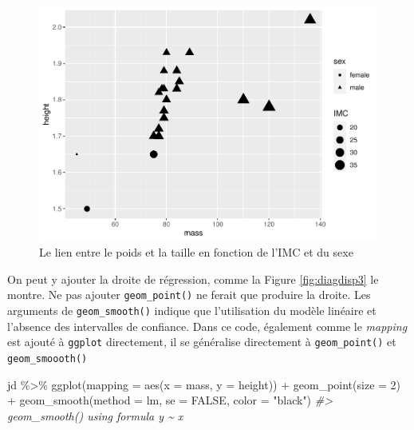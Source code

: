 \documentclass[
]{book}
\newenvironment{Shaded}{}{}
\newcommand{\AttributeTok}[1]{#1}
\newcommand{\CommentTok}[1]{\textit{#1}}
\newcommand{\ConstantTok}[1]{#1}
\newcommand{\DecValTok}[1]{#1}
\newcommand{\FunctionTok}[1]{#1}
\newcommand{\NormalTok}[1]{#1}
\newcommand{\SpecialCharTok}[1]{#1}
\newcommand{\StringTok}[1]{#1}
\begin{document}
\begin{figure}

{\centering \includegraphics[width=0.75\linewidth,height=0.75\textheight]{07-Visualiser_files/figure-latex/diagdisp2-1} 

}

\caption{Le lien entre le poids et la taille en fonction de l'IMC et du sexe}\label{fig:diagdisp2}
\end{figure}

On peut y ajouter la droite de régression, comme la Figure \ref{fig:diagdisp3} le montre. Ne pas ajouter \texttt{geom\_point()} ne ferait que produire la droite. Les arguments de \texttt{geom\_smooth()} indique que l'utilisation du modèle linéaire et l'absence des intervalles de confiance. Dans ce code, également comme le \emph{mapping} est ajouté à \texttt{ggplot} directement, il se généralise directement à \texttt{geom\_point()} et \texttt{geom\_smoooth()}

\begin{Shaded}
\begin{Highlighting}[]
\NormalTok{jd }\SpecialCharTok{\%\textgreater{}\%} 
  \FunctionTok{ggplot}\NormalTok{(}\AttributeTok{mapping =} \FunctionTok{aes}\NormalTok{(}\AttributeTok{x =}\NormalTok{ mass, }\AttributeTok{y =}\NormalTok{ height)) }\SpecialCharTok{+} 
  \FunctionTok{geom\_point}\NormalTok{(}\AttributeTok{size =} \DecValTok{2}\NormalTok{) }\SpecialCharTok{+}
  \FunctionTok{geom\_smooth}\NormalTok{(}\AttributeTok{method =}\NormalTok{ lm, }\AttributeTok{se =} \ConstantTok{FALSE}\NormalTok{, }\AttributeTok{color =} \StringTok{"black"}\NormalTok{)}
\CommentTok{\#\textgreater{} \textasciigrave{}geom\_smooth()\textasciigrave{} using formula \textquotesingle{}y \textasciitilde{} x\textquotesingle{}}
\end{Highlighting}
\end{Shaded}
\end{document}
